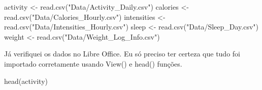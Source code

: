 \documentclass[
]{article}
\newenvironment{Shaded}{\begin{snugshade}}{\end{snugshade}}
\newcommand{\FunctionTok}[1]{\textcolor[rgb]{0.00,0.00,0.00}{#1}}
\newcommand{\NormalTok}[1]{#1}
\newcommand{\OtherTok}[1]{\textcolor[rgb]{0.56,0.35,0.01}{#1}}
\newcommand{\StringTok}[1]{\textcolor[rgb]{0.31,0.60,0.02}{#1}}
\begin{document}
\begin{Shaded}
\begin{Highlighting}[]
\NormalTok{activity }\OtherTok{\textless{}{-}} \FunctionTok{read.csv}\NormalTok{(}\StringTok{"Data/Activity\_Daily.csv"}\NormalTok{)}
\NormalTok{calories }\OtherTok{\textless{}{-}} \FunctionTok{read.csv}\NormalTok{(}\StringTok{"Data/Calories\_Hourly.csv"}\NormalTok{)}
\NormalTok{intensities }\OtherTok{\textless{}{-}} \FunctionTok{read.csv}\NormalTok{(}\StringTok{"Data/Intensities\_Hourly.csv"}\NormalTok{)}
\NormalTok{sleep }\OtherTok{\textless{}{-}} \FunctionTok{read.csv}\NormalTok{(}\StringTok{"Data/Sleep\_Day.csv"}\NormalTok{)}
\NormalTok{weight }\OtherTok{\textless{}{-}} \FunctionTok{read.csv}\NormalTok{(}\StringTok{"Data/Weight\_Log\_Info.csv"}\NormalTok{)}
\end{Highlighting}
\end{Shaded}

Já verifiquei os dados no Libre Office. Eu só preciso ter certeza que
tudo foi importado corretamente usando View() e head() funções.

\begin{Shaded}
\begin{Highlighting}[]
\FunctionTok{head}\NormalTok{(activity)}
\end{Highlighting}
\end{Shaded}
\end{document}
